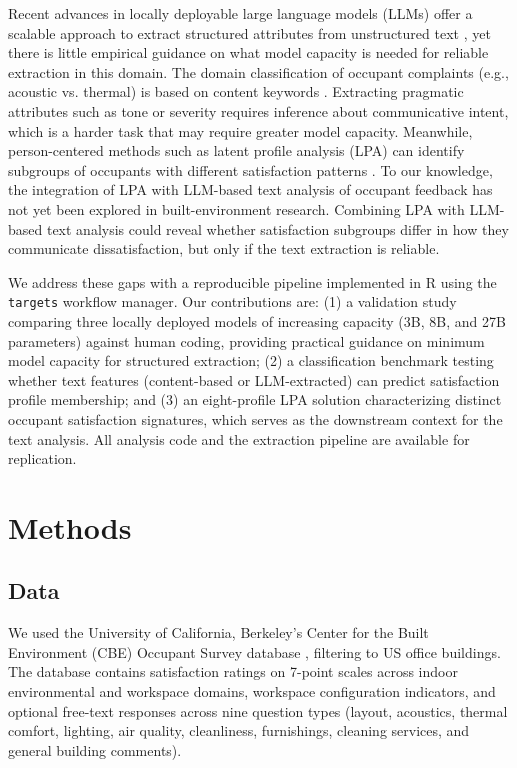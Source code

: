 \documentclass[sigconf]{acmart}
\begin{document}
Recent advances in locally deployable large language models (LLMs) offer a scalable approach to extract structured attributes from unstructured text \cite{hayes2025, player2025}, yet there is little empirical guidance on what model capacity is needed for reliable extraction in this domain. The domain classification of occupant complaints (e.g., acoustic vs. thermal) is based on content keywords \cite{sadick2025}. Extracting pragmatic attributes such as tone or severity requires inference about communicative intent, which is a harder task that may require greater model capacity. Meanwhile, person-centered methods such as latent profile analysis (LPA) can identify subgroups of occupants with different satisfaction patterns \cite{spurk2020}. To our knowledge, the integration of LPA with LLM-based text analysis of occupant feedback has not yet been explored in built-environment research. Combining LPA with LLM-based text analysis could reveal whether satisfaction subgroups differ in how they communicate dissatisfaction, but only if the text extraction is reliable.

We address these gaps with a reproducible pipeline implemented in R using the \texttt{targets} workflow manager. Our contributions are: (1) a validation study comparing three locally deployed models of increasing capacity (3B, 8B, and 27B parameters) against human coding, providing practical guidance on minimum model capacity for structured extraction; (2) a classification benchmark testing whether text features (content-based or LLM-extracted) can predict satisfaction profile membership; and (3) an eight-profile LPA solution characterizing distinct occupant satisfaction signatures, which serves as the downstream context for the text analysis. All analysis code and the extraction pipeline are available for replication.


\section{Methods}
\subsection{Data}
We used the University of California, Berkeley's Center for the Built Environment (CBE) Occupant Survey database \cite{graham2021}, filtering to US office buildings. The database contains satisfaction ratings on 7-point scales across indoor environmental and workspace domains, workspace configuration indicators, and optional free-text responses across nine question types (layout, acoustics, thermal comfort, lighting, air quality, cleanliness, furnishings, cleaning services, and general building comments).
\end{document}
